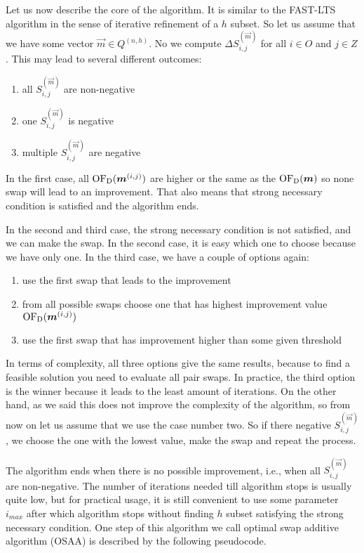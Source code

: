 Let us now describe the core of the algorithm. It is similar to the FAST-LTS algorithm in the sense of iterative refinement of a $h$ subset. So let us assume that we have some vector  $\vec{m} \in Q^{(n,h)}$. No we compute  $\Delta S^{(\vec{m})}_{i,j}$ for all $i \in O$ and $j \in Z$. This may lead to several different outcomes:
\begin{enumerate}
    \item all $S^{(\vec{m})}_{i,j}$ are non-negative
    \item one $S^{(\vec{m})}_{i,j}$ is negative
    \item multiple $S^{(\vec{m})}_{i,j}$ are negative
\end{enumerate}

In the first case, all $\operatorname{OF_D}(\boldsymbol{m}^{(i,j)})$ are higher or the same as the $\operatorname{OF_D}(\boldsymbol{m})$ so none swap will lead to an improvement. That also means that strong necessary condition is satisfied and the algorithm ends.

In the second and third case, the strong necessary condition is not satisfied, and we can make the swap. In the second case, it is easy which one to choose because we have only one. In the third case, we have a couple of options again:
\begin{enumerate}
    \item use the first swap that leads to the improvement
    \item from all possible swaps choose one that has highest improvement value  $\operatorname{OF_D}(\boldsymbol{m}^{(i,j)})$
    \item use the first swap that has improvement higher than some given threshold
\end{enumerate}

In terms of complexity, all three options give the same results, because to find a feasible solution you need to evaluate all pair swaps. In practice, the third option is the winner because it leads to the least amount of iterations. On the other hand, as we said this does not improve the complexity of the algorithm, so from now on let us assume that we use the case number two.
So if there negative  $S^{(\vec{m})}_{i,j}$, we choose the one with the lowest value, make the swap and repeat the process.  

The algorithm ends when there is no possible improvement, i.e., when all $S^{(\vec{m})}_{i,j}$ are non-negative.
The number of iterations needed till algorithm stops is usually quite low, but for practical usage, it is still convenient to use some parameter $i_{max}$ after which algorithm stops without finding $h$ subset satisfying the strong necessary condition. 
One step of this algorithm we call optimal swap additive algorithm (OSAA) is described by the following pseudocode.

